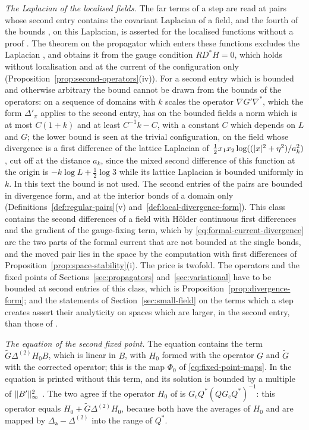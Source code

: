 \documentclass[11pt]{preprint}
\DeclarePairedDelimiter{\abs}{\lvert}{\rvert}
\DeclarePairedDelimiter{\norm}{\lVert}{\rVert}
\numberwithin{equation}{section}
\begin{document}
\emph{The Laplacian of the localised fields.} The far terms of a step are read at pairs whose second entry contains the covariant Laplacian of a field, and the fourth of the bounds \cite[(3.14), p.~272]{BalabanRG1}, on this Laplacian, is asserted for the localised functions without a proof \cite[p.~273]{BalabanRG1}. The theorem on the propagator which enters these functions excludes the Laplacian \cite[p.~422]{BalabanPBG}, and \cite[(137)--(139), p.~298]{BalabanVAR} obtains it from the gauge condition $RD^*H = 0$, which holds without localisation and at the current of the configuration only (Proposition~\ref{prop:second-operators}(iv)). For a second entry which is bounded and otherwise arbitrary the bound cannot be drawn from the bounds of the operators: on a sequence of domains with $k$ scales the operator $\nabla G'\nabla^*$, which the form $\Delta'_\pi$ applies to the second entry, has on the bounded fields a norm which is at most $C(1 + k)$ and at least $C^{-1}k - C$, with a constant $C$ which depends on $L$ and $G$; the lower bound is seen at the trivial configuration, on the field whose divergence is a first difference of the lattice Laplacian of $\frac{1}{2}x_1x_2\log((\abs x^2 + \eta^2)/a_k^2)$, cut off at the distance $a_k$, since the mixed second difference of this function at the origin is $-k\log L + \frac{1}{2}\log 3$ while its lattice Laplacian is bounded uniformly in $k$. In this text the bound is not used. The second entries of the pairs are bounded in divergence form, and at the interior bonds of a domain only (Definitions~\ref{def:regular-pairs}(v) and~\ref{def:local-divergence-form}). This class contains the second differences of a field with H\"older continuous first differences and the gradient of the gauge-fixing term, which by \eqref{eq:formal-current-divergence} are the two parts of the formal current that are not bounded at the single bonds, and the moved pair lies in the space by the computation with first differences of Proposition~\ref{prop:space-stability}(i). The price is twofold. The operators and the fixed points of Sections~\ref{sec:propagators} and~\ref{sec:variational} have to be bounded at second entries of this class, which is Proposition~\ref{prop:divergence-form}; and the statements of Section~\ref{sec:small-field} on the terms which a step creates assert their analyticity on spaces which are larger, in the second entry, than those of \cite[Theorem~3]{BalabanRG1}.

\emph{The equation of the second fixed point.} The equation \cite[(180), p.~306]{BalabanVAR} contains the term $\tilde G\Delta^{(2)}H_0B$, which is linear in $B$, with $H_0$ formed with the operator $G$ and $\tilde G$ with the corrected operator; this is the map $\Phi_0$ of \eqref{eq:fixed-point-maps}. In \cite[(1.2), (1.4), p.~2]{BalabanRG2} the equation is printed without this term, and its solution is bounded by a multiple of $\norm{B'}_\infty^2$ \cite[(1.16), p.~6]{BalabanRG2}. The two agree if the operator $H_0$ of \cite{BalabanRG2} is $G_{\mathrm c}Q^*(QG_{\mathrm c}Q^*)^{-1}$: this operator equals $H_0 + \tilde G\Delta^{(2)}H_0$, because both have the averages of $H_0$ and are mapped by $\Delta_{\mathsf a} - \Delta^{(2)}$ into the range of $Q^*$.
\end{document}
